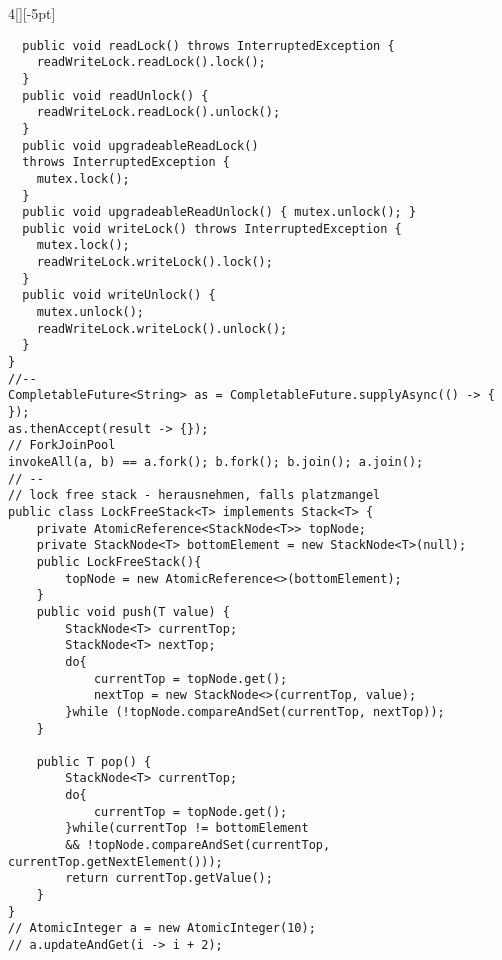 \documentclass[%
	pdftex,%
	a4paper,%
	landscape,%
	ngerman,
	oneside,%
	6pt,%
	halfparskip,%
]{scrbook}
\begin{document}
\begin{multicols}{4}[][-5pt]
\begin{lstlisting}
  public void readLock() throws InterruptedException {
    readWriteLock.readLock().lock();
  }
  public void readUnlock() {
    readWriteLock.readLock().unlock();
  }
  public void upgradeableReadLock() 
  throws InterruptedException {
    mutex.lock();
  }
  public void upgradeableReadUnlock() { mutex.unlock(); }
  public void writeLock() throws InterruptedException {
    mutex.lock();
    readWriteLock.writeLock().lock();
  }
  public void writeUnlock() {
    mutex.unlock();
    readWriteLock.writeLock().unlock();
  }
}
//--
CompletableFuture<String> as = CompletableFuture.supplyAsync(() -> {
});
as.thenAccept(result -> {});
// ForkJoinPool
invokeAll(a, b) == a.fork(); b.fork(); b.join(); a.join();
// --
// lock free stack - herausnehmen, falls platzmangel
public class LockFreeStack<T> implements Stack<T> {
    private AtomicReference<StackNode<T>> topNode;
    private StackNode<T> bottomElement = new StackNode<T>(null);
    public LockFreeStack(){
        topNode = new AtomicReference<>(bottomElement);
    }
    public void push(T value) {
        StackNode<T> currentTop;
        StackNode<T> nextTop;
        do{
            currentTop = topNode.get();
            nextTop = new StackNode<>(currentTop, value);
        }while (!topNode.compareAndSet(currentTop, nextTop));
    }

    public T pop() {
        StackNode<T> currentTop;
        do{
            currentTop = topNode.get();
        }while(currentTop != bottomElement
        && !topNode.compareAndSet(currentTop, currentTop.getNextElement()));
        return currentTop.getValue();
    }
}
// AtomicInteger a = new AtomicInteger(10);
// a.updateAndGet(i -> i + 2);

\end{lstlisting}


\end{multicols}
\end{document}
